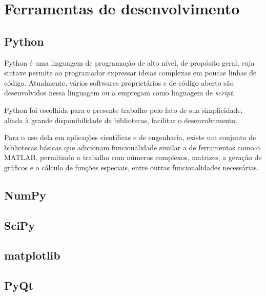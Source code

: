 \section{Ferramentas de desenvolvimento}
\subsection{Python}

Python é uma linguagem de programação de alto nível, de propósito geral, cuja sintaxe permite ao programador expressar ideias complexas em poucas linhas de código. Atualmente, vários softwares proprietários e de código aberto são desenvolvidos nessa linguagem ou a empregam como linguagem de \textit{script}.

Python foi escolhida para o presente trabalho pelo fato de sua simplicidade, aliada à grande disponibilidade de bibliotecas, facilitar o desenvolvimento.

Para o uso dela em aplicações científicas e de engenharia, existe um conjunto de bibliotecas básicas que adicionam funcionalidade similar a de ferramentas como o MATLAB, permitindo o trabalho com números complexos, matrizes, a geração de gráficos e o cálculo de funções especiais, entre outras funcionalidades necessárias.

\subsection{NumPy}
\subsection{SciPy}
\subsection{matplotlib}
\subsection{PyQt}
